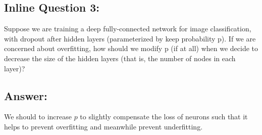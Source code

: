 \documentclass[11pt]{article}
\makeatletter
\newcommand{\boxspacing}{\kern\kvtcb@left@rule\kern\kvtcb@boxsep}
\newcommand{\prompt}[4]{
        {\ttfamily\llap{{\color{#2}[#3]:\hspace{3pt}#4}}\vspace{-\baselineskip}}
    }
\makeatother
\begin{document}
    \hypertarget{inline-question-3}{%
\subsection{Inline Question 3:}\label{inline-question-3}}

Suppose we are training a deep fully-connected network for image
classification, with dropout after hidden layers (parameterized by keep
probability p). If we are concerned about overfitting, how should we
modify p (if at all) when we decide to decrease the size of the hidden
layers (that is, the number of nodes in each layer)?

\hypertarget{answer}{%
\subsection{Answer:}\label{answer}}

We should to increase \(p\) to slightly compensate the loss of neurons
such that it helps to prevent overfitting and meanwhile prevent
underfitting.

    \begin{tcolorbox}[breakable, size=fbox, boxrule=1pt, pad at break*=1mm,colback=cellbackground, colframe=cellborder]
\prompt{In}{incolor}{ }{\boxspacing}
\begin{Verbatim}[commandchars=\\\{\}]

\end{Verbatim}
\end{tcolorbox}


    
    
    
\end{document}

